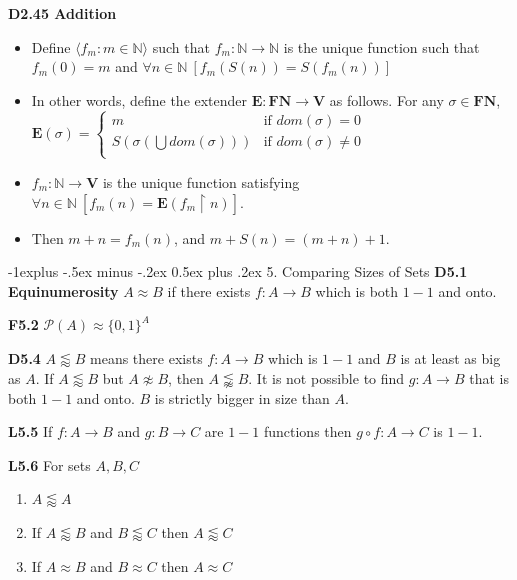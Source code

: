 \documentclass[10pt, landscape]{article}
\makeatletter
\renewcommand{\section}{\@startsection{section}{1}{0mm}%
                                {-1ex plus -.5ex minus -.2ex}%
                                {0.5ex plus .2ex}%
                                {\normalfont\large\bfseries}}
\renewcommand{\section}{\@startsection{section}{2}{0mm}%
                                {-1explus -.5ex minus -.2ex}%
                                {0.5ex plus .2ex}%
                                {\normalfont\normalsize\bfseries}}
\makeatother
\begin{document}
\begin{multicols*}{3}
\textbf{D2.45 Addition}
\begin{itemize}
    \item Define $\langle f_m : m \in \mathbb{N} \rangle$ such that $f_m: \mathbb{N} \rightarrow \mathbb{N}$ is the unique function such that $f_m(0)=m$ and $\forall n \in \mathbb{N} \ [f_m(S(n))=S(f_m(n))]$
    \item In other words, define the extender $\mathbf{E:FN\rightarrow V}$ as follows. For any $\sigma \in \mathbf{FN}$, $\mathbf{E}(\sigma) =
    \left\{
    \begin{array}{lr}
      m & \text{if $dom(\sigma)=0$} \\
      S(\sigma(\bigcup dom(\sigma))) & \text{if $dom(\sigma) \neq 0$} \\
    \end{array}
    \right.
    $
    \item $f_m:\mathbb{N}\rightarrow \mathbf{V}$ is the unique function satisfying $\forall n \in \mathbb{N} \ [f_m(n)=\mathbf{E}(f_m \restriction n)]$.
    \item Then $m+n=f_m(n)$, and $m + S(n) = (m+n)+1$.
\end{itemize}

\section{5. Comparing Sizes of Sets}
\textbf{D5.1 Equinumerosity} $A \approx B$ if there exists $f:A \rightarrow B$ which is both $1-1$ and onto.

\textbf{F5.2} $\mathcal{P}(A)\approx\{0, 1\}^A$

\textbf{D5.4} $A \lessapprox B$ means there exists $f:A \rightarrow B$ which is $1-1$ and $B$ is at least as big as $A$. If $A \lessapprox B$ but $A \not\approx B$, then $A \lnapprox B$. It is not possible to find $g : A \rightarrow B$ that is both $1-1$ and onto. $B$ is strictly bigger in size than $A$.

\textbf{L5.5} If $f:A \rightarrow B$ and $g:B \rightarrow C$ are $1-1$ functions then $g \circ f : A \rightarrow C$ is $1-1$.

\textbf{L5.6} For sets $A,B,C$
\begin{enumerate}
    \item $A \lessapprox A$
    \item If $A \lessapprox B$ and $B \lessapprox C$ then $A \lessapprox C$
    \item If $A \approx B$ and $B \approx C$ then $A \approx C$
\end{enumerate}


\end{multicols*}
\end{document}
